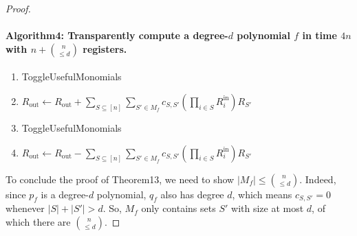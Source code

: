 \documentclass[10pt,a4paper]{article}
\begin{document}
\begin{proof}
\paragraph{Algorithm4: Transparently compute a degree-$d$ polynomial $f$ in time $4n$ with $n+\binom n{\leq d}$ registers.}
\begin{enumerate}[label=\arabic*:]
\item ToggleUsefulMonomials
\item $R_{\mathrm{out}}\leftarrow R_{\mathrm{out}}+\sum_{S\subseteq[n]}\sum_{S'\in M_f}c_{S,S'}(\prod_{i\in S}R_i^{\mathrm{in}})R_{S'}$
\item ToggleUsefulMonomials
\item $R_{\mathrm{out}}\leftarrow R_{\mathrm{out}}-\sum_{S\subseteq[n]}\sum_{S'\in M_f}c_{S,S'}(\prod_{i\in S}R_i^{\mathrm{in}})R_{S'}$
\end{enumerate}
To conclude the proof of Theorem13, we need to show $|M_f|\leq\binom n{\leq d}$. Indeed, since $p_f$ is a degree-$d$ polynomial, $q_f$ also has degree $d$, which means $c_{S,S'}=0$ whenever $|S|+|S'|>d$. So, $M_f$ only contains sets $S'$ with size at most $d$, of which there are $\binom n{\leq d}$.
\end{proof}
\end{document}
